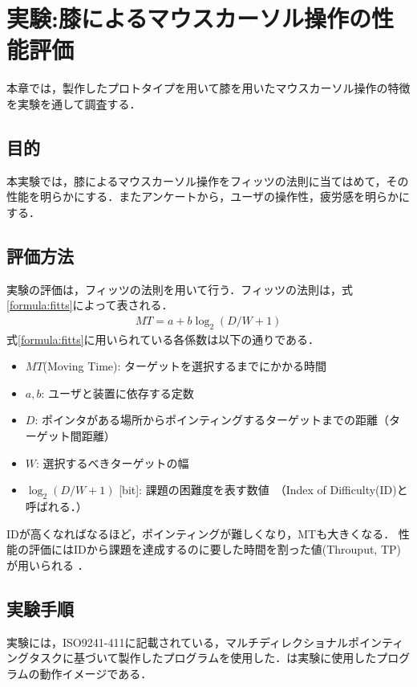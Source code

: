 \chapter{実験:膝によるマウスカーソル操作の性能評価} 
本章では，製作したプロトタイプを用いて膝を用いたマウスカーソル操作の特徴を実験を通して調査する．
\section{目的}
本実験では，膝によるマウスカーソル操作をフィッツの法則\cite{fitts}に当てはめて，その性能を明らかにする．またアンケートから，ユーザの操作性，疲労感を明らかにする．
\section{評価方法}
実験の評価は，フィッツの法則を用いて行う．フィッツの法則は，式\ref{formula:fitts}によって表される．
\begin{eqnarray}
	MT = a + b\log_2{(D/W + 1)}
	\label{formula:fitts}
\end{eqnarray}
式\ref{formula:fitts}に用いられている各係数は以下の通りである．
\begin{itemize}
	\item {$MT$(Moving Time): }ターゲットを選択するまでにかかる時間
	\item {$a,b$: }ユーザと装置に依存する定数
	\item {$D$: }ポインタがある場所からポインティングするターゲットまでの距離（ターゲット間距離）%
	\item {$W$: }選択するべきターゲットの幅
	\item { $\log_2{(D/W + 1)}$ [bit]: } 課題の困難度を表す数値\ （Index of Difficulty(ID)と呼ばれる．）
\end{itemize}
IDが高くなればなるほど，ポインティングが難しくなり，MTも大きくなる．
性能の評価にはIDから課題を達成するのに要した時間を割った値(Throuput, TP)が用いられる
．
\begin{comment}
	\begin{eqnarray}
	TP = \cfrac{ID}{MT}
	\label{formula:tp}
\end{eqnarray}
\end{comment}

\section{実験手順}
実験には，ISO9241-411\cite{9241411}に記載されている，マルチディレクショナルポインティングタスクに基づいて製作したプログラムを使用した．は実験に使用したプログラムの動作イメージである．

